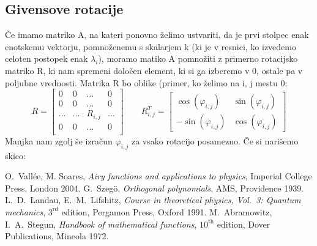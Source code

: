 \documentclass{article}
\def\phi{\varphi}
\begin{document}
\subsection{Givensove rotacije}
Če imamo matriko A, na kateri ponovno želimo ustvariti, da je prvi stolpec enak enotskemu vektorju, pomnoženemu s skalarjem k (ki je v resnici, ko izvedemo celoten postopek enak $\lambda_i$), moramo matiko A pomnožiti z primerno rotacijsko matriko R, ki nam spremeni določen element, ki si ga izberemo v 0, ostale pa v poljubne vrednosti. Matrika R bo oblike (primer, ko želimo na i, j mestu 0:
\begin{equation*}
R=\begin{bmatrix}
 0 & 0 & ... & 0 \\
 0 & 0 & ... & 0 \\
 ... & ... &  R_{i,j} & ... \\
  0 & 0 & ... & 0 \\
\end{bmatrix}
\qquad
    R_{i,j}^T=\begin{bmatrix}
     \cos(\phi_{i,j})& \sin(\phi_{i,j}) \\
     -\sin(\phi_{i,j}) & \cos(\phi_{i,j})
    \end{bmatrix}
\end{equation*}
Manjka nam zgolj še izračun $\phi_{i,j}$ za vsako rotacijo posamezno.
Če si narišemo skico: \\
\begin{center}
\end{center}

\begin{thebibliography}{99}
\setlength{\itemsep}{.2\itemsep}\setlength{\parsep}{.5\parsep}
 O.~Vall\'ee, M. Soares,
  {\sl Airy functions and applications to physics},
  Imperial College Press, London 2004.
 G.~Szeg\"o, {\sl Orthogonal polynomials},
  AMS, Providence 1939.
 L.~D.~Landau, E.~M.~Lifshitz, {\sl Course in
  theoretical physics, Vol.~3: Quantum mechanics},
  $3^\mathrm{rd}$ edition, Pergamon Press, Oxford 1991.
 M.~Abramowitz, I.~A.~Stegun, {\sl Handbook of mathematical
  functions}, $10^\mathrm{th}$ edition, Dover Publications, Mineola 1972.
\end{thebibliography}
\end{document}
